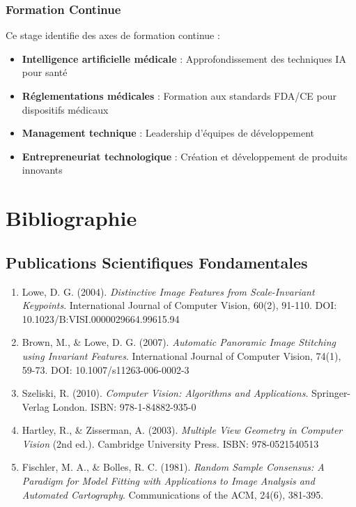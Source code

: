 \documentclass[12pt,a4paper]{report}
\begin{document}
\subsection{Formation Continue}

Ce stage identifie des axes de formation continue :

\begin{itemize}
\item \textbf{Intelligence artificielle médicale} : Approfondissement des techniques IA pour santé
\item \textbf{Réglementations médicales} : Formation aux standards FDA/CE pour dispositifs médicaux
\item \textbf{Management technique} : Leadership d'équipes de développement
\item \textbf{Entrepreneuriat technologique} : Création et développement de produits innovants
\end{itemize}

\chapter{Bibliographie}

\section{Publications Scientifiques Fondamentales}

\begin{enumerate}
\item Lowe, D. G. (2004). \textit{Distinctive Image Features from Scale-Invariant Keypoints}. International Journal of Computer Vision, 60(2), 91-110. DOI: 10.1023/B:VISI.0000029664.99615.94

\item Brown, M., \& Lowe, D. G. (2007). \textit{Automatic Panoramic Image Stitching using Invariant Features}. International Journal of Computer Vision, 74(1), 59-73. DOI: 10.1007/s11263-006-0002-3

\item Szeliski, R. (2010). \textit{Computer Vision: Algorithms and Applications}. Springer-Verlag London. ISBN: 978-1-84882-935-0

\item Hartley, R., \& Zisserman, A. (2003). \textit{Multiple View Geometry in Computer Vision} (2nd ed.). Cambridge University Press. ISBN: 978-0521540513

\item Fischler, M. A., \& Bolles, R. C. (1981). \textit{Random Sample Consensus: A Paradigm for Model Fitting with Applications to Image Analysis and Automated Cartography}. Communications of the ACM, 24(6), 381-395.
\end{enumerate}
\end{document}
